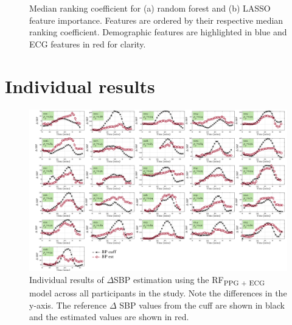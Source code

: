 \documentclass[fleqn,10pt]{wlscirep}
\begin{document}
\begin{figure}[h]
\begin{subfigure}{.49\textwidth}
		\caption{}
	\end{subfigure}
	\caption{Median ranking coefficient for (a) random forest and (b) LASSO feature importance. Features are ordered by their respective median ranking coefficient. Demographic features are highlighted in blue and ECG features in red for clarity.}
	\label{fig:Ranking_coeffs_appendix}
\end{figure}

\clearpage
\section{Individual results}



\begin{figure}[h!]
	\centering
	\includegraphics[width = \textwidth]{Individual_results_SBP.png}
	\caption{Individual results of $\Delta$SBP estimation using the RF\textsubscript{PPG + ECG} model across all participants in the study. Note the differences in the y-axis. The reference $\Delta$ SBP values from the cuff are shown in black and the estimated values are shown in red.}
	\label{fig:Individual_results_SBP}
\end{figure}
\end{document}
